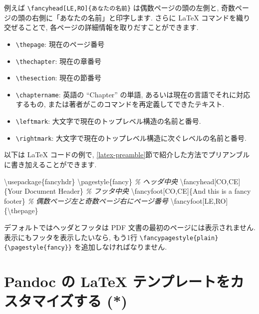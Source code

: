 \documentclass[
  11pt,
  lualatex,ja=standard,jafont=noto]{bxjsreport}
\newenvironment{Shaded}{\begin{snugshade}}{\end{snugshade}}
\newcommand{\BuiltInTok}[1]{#1}
\newcommand{\CommentTok}[1]{\textcolor[rgb]{0.56,0.35,0.01}{\textit{#1}}}
\newcommand{\ExtensionTok}[1]{#1}
\newcommand{\FunctionTok}[1]{\textcolor[rgb]{0.00,0.00,0.00}{#1}}
\newcommand{\NormalTok}[1]{#1}
\providecommand{\tightlist}{%
  \setlength{\itemsep}{0pt}\setlength{\parskip}{0pt}}
\begin{document}
例えば \texttt{\textbackslash{}fancyhead{[}LE,RO{]}\{あなたの名前\}} は偶数ページの頭の左側と, 奇数ページの頭の右側に「あなたの名前」と印字します. さらに LaTeX コマンドを織り交ぜることで, 各ページの詳細情報を取りだすことができます.

\begin{itemize}
\tightlist
\item
  \texttt{\textbackslash{}thepage}: 現在のページ番号
\item
  \texttt{\textbackslash{}thechapter}: 現在の章番号
\item
  \texttt{\textbackslash{}thesection}: 現在の節番号
\item
  \texttt{\textbackslash{}chaptername}: 英語の ``Chapter'' の単語, あるいは現在の言語でそれに対応するもの, または著者がこのコマンドを再定義してできたテキスト.
\item
  \texttt{\textbackslash{}leftmark}: 大文字で現在のトップレベル構造の名前と番号.
\item
  \texttt{\textbackslash{}rightmark}: 大文字で現在のトップレベル構造に次ぐレベルの名前と番号.
\end{itemize}

以下は LaTeX コードの例で, \ref{latex-preamble}節で紹介した方法でプリアンブルに書き加えることができます.

\begin{Shaded}
\begin{Highlighting}[]
\BuiltInTok{\textbackslash{}usepackage}\NormalTok{\{}\ExtensionTok{fancyhdr}\NormalTok{\}}
\FunctionTok{\textbackslash{}pagestyle}\NormalTok{\{fancy\}}
\CommentTok{\% ヘッダ中央}
\FunctionTok{\textbackslash{}fancyhead}\NormalTok{[CO,CE]\{Your Document Header\}}
\CommentTok{\% フッタ中央}
\FunctionTok{\textbackslash{}fancyfoot}\NormalTok{[CO,CE]\{And this is a fancy footer\}}
\CommentTok{\% 偶数ページ左と奇数ページ右にページ番号}
\FunctionTok{\textbackslash{}fancyfoot}\NormalTok{[LE,RO]\{}\FunctionTok{\textbackslash{}thepage}\NormalTok{\}}
\end{Highlighting}
\end{Shaded}

デフォルトではヘッダとフッタは PDF 文書の最初のページには表示されません. 表示にもフッタを表示したいなら, もう1行 \texttt{\textbackslash{}fancypagestyle\{plain\}\{\textbackslash{}pagestyle\{fancy\}\}} を追加しなければなりません.

\hypertarget{latex-template}{%
\section{Pandoc の LaTeX テンプレートをカスタマイズする (*)}\label{latex-template}}
\end{document}
